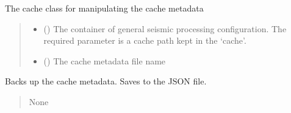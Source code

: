 \documentclass[letterpaper,10pt,english]{sphinxmanual}
\begin{document}
\begin{fulllineitems}
\label{\detokenize{api_core:amw.core.signal_utils.Cache}}
\pysigstartsignatures
{}
\pysigstopsignatures
\sphinxAtStartPar
The cache class for manipulating the cache metadata
\begin{quote}\begin{description}
\begin{itemize}
\item {} 
\sphinxAtStartPar
{} () \textendash{} The container of general seismic processing configuration.
The required parameter is a cache path kept in the ‘cache’.

\item {} 
\sphinxAtStartPar
{} () \textendash{} The cache metadata file name

\end{itemize}

\end{description}\end{quote}

\begin{fulllineitems}
\label{\detokenize{api_core:amw.core.signal_utils.Cache.backup}}
\pysigstartsignatures
{}
\pysigstopsignatures
\sphinxAtStartPar
Backs up the cache metadata. Saves to the JSON file.
\begin{quote}\begin{description}
\sphinxAtStartPar
None

\end{description}\end{quote}

\end{fulllineitems}


\end{fulllineitems}

\end{document}

